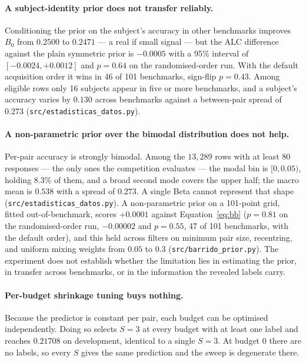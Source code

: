 \documentclass{article}
\begin{document}
\paragraph{A subject-identity prior does not transfer reliably.} Conditioning the
prior on the subject's accuracy in other benchmarks improves $B_0$ from $0.2500$
to $0.2471$ --- a real if small signal --- but the ALC difference against the
plain symmetric prior is $-0.0005$ with a 95\% interval of $[-0.0024,+0.0012]$ and
$p=0.64$ on the randomised-order run. With the default acquisition order it wins
in 46 of 101 benchmarks, sign-flip $p=0.43$. Among eligible rows only 16 subjects appear in
five or more benchmarks, and a subject's accuracy varies by $0.130$ across
benchmarks against a between-pair spread of $0.273$
(\texttt{src/estadisticas\_datos.py}).

\paragraph{A non-parametric prior over the bimodal distribution does not help.}
Per-pair accuracy is strongly bimodal. Among the $13{,}289$ rows with at least
80 responses --- the only ones the competition evaluates --- the modal bin is
$[0,0.05)$, holding $8.3\%$ of them, and a broad second mode covers the upper
half; the macro mean is $0.538$ with a spread of $0.273$. A single Beta cannot
represent that shape (\texttt{src/estadisticas\_datos.py}). A
non-parametric prior on a 101-point grid, fitted out-of-benchmark, scores
$+0.0001$ against Equation~\eqref{eq:bb} ($p=0.81$ on the randomised-order run,
$-0.00002$ and $p=0.55$, 47 of 101 benchmarks, with the default order), and this held across filters
on minimum pair size, recentring, and uniform mixing weights from $0.05$ to
$0.3$ (\texttt{src/barrido\_prior.py}). The experiment does not establish whether
the limitation lies in estimating the prior, in transfer across benchmarks, or in
the information the revealed labels carry.

\paragraph{Per-budget shrinkage tuning buys nothing.} Because the predictor is
constant per pair, each budget can be optimised independently. Doing so selects
$S=3$ at every budget with at least one label and reaches $0.21708$ on
development, identical to a single $S=3$. At budget $0$ there are no labels, so
every $S$ gives the same prediction and the sweep is degenerate there.
\end{document}
